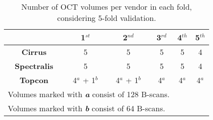 \begin{table*}[!ht]
	\setlength{\tabcolsep}{6pt}
	\renewcommand{\arraystretch}{1.3}
	\caption{Number of OCT volumes per vendor in each fold, considering 5-fold validation.}
	\centering
	\begin{tabular}{|c|c|c|c|c|c|}
		\hline
		& \textbf{1$^{st}$} & \textbf{2$^{nd}$} & \textbf{3$^{rd}$} & \textbf{4$^{th}$} & \textbf{5$^{th}$} \\
		\hline
		\textbf{Cirrus} & 5 & 5 & 5 & 5 & 4 \\
		\textbf{Spectralis} & 5 & 5 & 5 & 5 & 4 \\
		\textbf{Topcon} & 4$^{a}$ + 1$^{b}$ & 4$^{a}$ + 1$^{b}$ & 4$^{a}$ & 4$^{a}$ & 4$^{a}$ \\
		\hline
		\multicolumn{4}{l}{Volumes marked with \textbf{\textit{a}} consist of 128 B-scans.} \\
		\multicolumn{4}{l}{Volumes marked with \textbf{\textit{b}} consist of 64 B-scans.}
	\end{tabular}
	\label{tab:FiveFoldSplit}
\end{table*}

